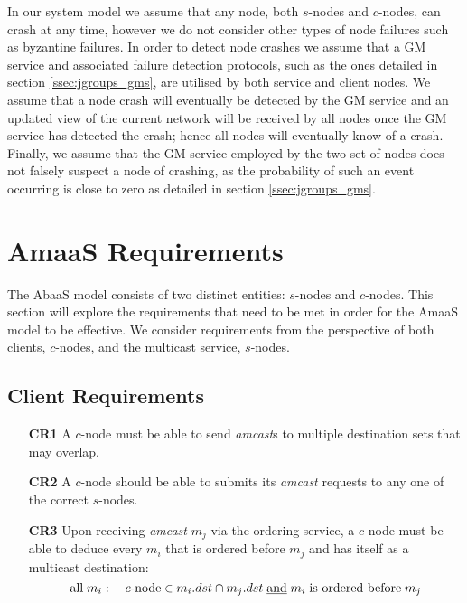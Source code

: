     In our system model we assume that any node, both $s$-nodes and $c$-nodes, can crash at any time, however we do not consider other types of node failures such as byzantine failures.  In order to detect node crashes we assume that a GM service and associated failure detection protocols, such as the ones detailed in section \ref{ssec:jgroups_gms}, are utilised by both service and client nodes.  We assume that a node crash will eventually be detected by the GM service and an updated view of the current network will be received by all nodes once the GM service has detected the crash; hence all nodes will eventually know of a crash.  Finally, we assume that the GM service employed by the two set of nodes does not falsely suspect a node of crashing, as the probability of such an event occurring is close to zero as detailed in section \ref{ssec:jgroups_gms}.  
    
	
\section{AmaaS Requirements}\label{sec:absaas_requirements}
The \textsf{AbaaS} model consists of two distinct entities: $s$-nodes and $c$-nodes.  This section will explore the requirements that need to be met in order for the \textsf{AmaaS} model to be effective.  We consider requirements from the perspective of both clients, $c$-nodes, and the multicast service, $s$-nodes.

	\subsection*{Client Requirements}
	\begin{itemize}
		\item [\textbf{CR1}] A $c$-node must be able to send \emph{amcast}s to multiple destination sets that may overlap.
		
		\item [\textbf{CR2}] A $c$-node should be able to submits its \emph{amcast} requests to any one of the correct $s$-nodes.  
		
		\item [\textbf{CR3}] Upon receiving \emph{amcast} $m_j$ via the ordering service, a $c$-node must be able to deduce every $m_i$ that is ordered before $m_j$ and has itself as a multicast destination:
		\begin{equation*}
		    \mbox{all}\; m_i : \quad c\mbox{-node} \in m_i.dst \cap m_j.dst \;\mbox{\underline{and}}\; m_i \;\mbox{is ordered before}\; m_j
		\end{equation*}
	\end{itemize}
	
